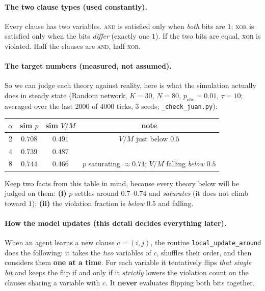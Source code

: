 \documentclass[11pt]{article}
\begin{document}
\paragraph{The two clause types (used constantly).} Every clause has two variables.
\textsc{and} is satisfied only when \emph{both} bits are $1$; \textsc{xor} is satisfied only when
the bits \emph{differ} (exactly one $1$). If the two bits are equal, \textsc{xor} is violated. Half
the clauses are \textsc{and}, half \textsc{xor}.

\paragraph{The target numbers (measured, not assumed).} So we can judge each theory against
reality, here is what the simulation actually does in steady state (Random network, $K=30$,
$N=80$, $p_{\text{obs}}=0.01$, $\tau=10$; averaged over the last $2000$ of $4000$ ticks, $3$ seeds;
\texttt{\_check\_juan.py}):

\begin{center}
\begin{tabular}{cccc}
\toprule
$\alpha$ & sim $p$ & sim $V/M$ & note\\
\midrule
2 & $0.708$ & $0.491$ & $V/M$ just below $0.5$\\
4 & $0.739$ & $0.487$ & \\
8 & $0.744$ & $0.466$ & $p$ saturating $\approx0.74$; $V/M$ falling \emph{below} $0.5$\\
\bottomrule
\end{tabular}
\end{center}

Keep two facts from this table in mind, because every theory below will be judged on them:
\textbf{(i)} $p$ settles around $0.7$--$0.74$ and \emph{saturates} (it does not climb toward $1$);
\textbf{(ii)} the violation fraction is \emph{below $0.5$} and falling.

\paragraph{How the model updates (this detail decides everything later).} When an agent learns a
new clause $c=(i,j)$, the routine \texttt{local\_update\_around} does the following: it takes the
\emph{two} variables of $c$, shuffles their order, and then considers them \textbf{one at a time}.
For each variable it tentatively flips \emph{that single bit} and keeps the flip if and only if it
\emph{strictly} lowers the violation count on the clauses sharing a variable with $c$. It
\textbf{never} evaluates flipping both bits together.
\end{document}
